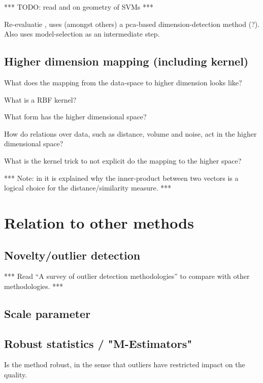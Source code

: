 *** TODO: read \cite{mavroforakis2006geometric} and \cite{bennett2000duality} on geometry of SVMs ***


Re-evaluatie \cite{guo2012adaptive}, uses (amongst others) a pca-based dimension-detection method (?).
Also uses model-selection as an intermediate step.


\subsection{Higher dimension mapping (including kernel)}
What does the mapping from the data-space to higher dimension looks like?

What is a RBF kernel?

What form has the higher dimensional space?

How do relations over data, such as distance, volume and noise, act in the higher dimensional space?

What is the kernel trick to not explicit do the mapping to the higher space?


*** Note: in \cite{mavroforakis2006geometric} it is explained why the inner-product between two vectors is a logical choice for the distance/similarity measure. ***


\section{Relation to other methods}

\subsection{Novelty/outlier detection}
*** Read \cite{hodge2004survey} ``A survey of outlier detection methodologies'' to compare with other methodologies. ***


\subsection{Scale parameter}
\subsection{Robust statistics / "M-Estimators"}
Is the method robust, in the sense that outliers have restricted impact on the quality.

